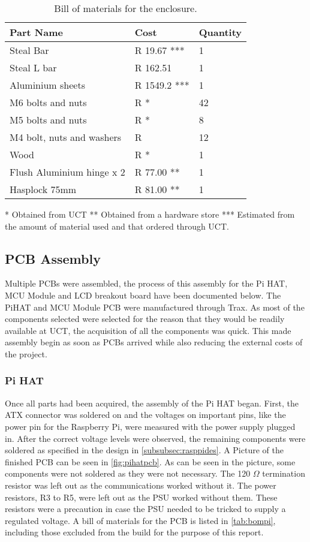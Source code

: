 \documentclass[a4paper,11pt]{article}
\numberwithin{figure}{section}
\numberwithin{table}{section}
\begin{document}
	\begin{table}[ht]
	\centering		
	\begin{tabular}{| m{8cm} | m{4cm}| m{3cm} |}
	\hline
	\textbf{Part Name} & \textbf{Cost} & \textbf{Quantity} \\
	\hline
	Steal Bar & R 19.67 *** & 1 \\
	\hline
	Steal L bar & R 162.51 & 1 \\
	\hline	
	Aluminium sheets & R 1549.2 *** & 1 \\
	\hline	
	M6 bolts and nuts & R * & 42 \\
	\hline
	M5 bolts and nuts & R * & 8 \\
	\hline
	M4 bolt, nuts and washers & R & 12\\	
	\hline
	Wood & R * & 1\\
	\hline	
	Flush Aluminium hinge x 2 & R 77.00 ** & 1 \\
	\hline
	Hasplock 75mm & R 81.00 ** & 1 \\
	\hline
	\end{tabular}
	
	 * Obtained from UCT
	 ** Obtained from a hardware store
	 *** Estimated from the amount of material used and that ordered through UCT.
	\caption{Bill of materials for the enclosure. \label{tab:bomen}}
	\end{table}	

\subsection{PCB Assembly}
Multiple PCBs were assembled, the process of this assembly for the Pi HAT, MCU Module and LCD breakout board have been documented below. The PiHAT and MCU Module PCB were manufactured through Trax. As most of the components selected were selected for the reason that they would be readily available at UCT, the acquisition of all the components was quick. This made assembly begin as soon as PCBs arrived while also reducing the external costs of the project.

\subsubsection{Pi HAT}

Once all parts had been acquired, the assembly of the Pi HAT began. First, the ATX connector was soldered on and the voltages on important pins, like the power pin for the Raspberry Pi, were measured with the power supply plugged in. After the correct voltage levels were observed, the remaining components were soldered as specified in the design in \autoref{subsubsec:rasppides}. A Picture of the finished PCB can be seen in \autoref{fig:pihatpcb}. As can be seen in the picture, some components were not soldered as they were not necessary. The 120 $\Omega$ termination resistor was left out as the communications worked without it. The power resistors, R3 to R5, were left out as the PSU worked without them. These resistors were a precaution in case the PSU needed to be tricked to supply a regulated voltage. A bill of materials for the PCB is listed in \autoref{tab:bompi}, including those excluded from the build for the purpose of this report.
	
\end{document}
